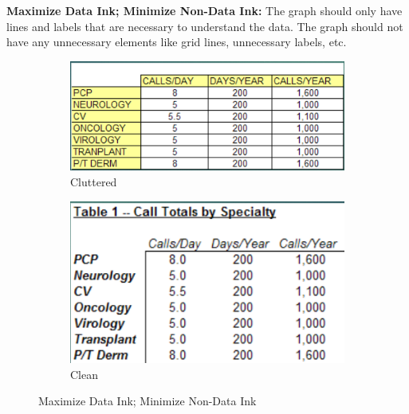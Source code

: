 \documentclass[11pt,fleqn]{book} %
\begin{document}
\begin{example}
  \textbf{Maximize Data Ink; Minimize Non-Data Ink:}
  The graph should only have lines and labels that are
  necessary to understand the data. The graph should
  not have any unnecessary elements like grid lines,
  unnecessary labels, etc.


  \begin{figure}[hitb!]
    \centering
    \begin{subfigure}[c]{0.45\linewidth}
        \includegraphics[width=\linewidth]{Pictures/max-data1.png}
        \caption{Cluttered}
        \label{fig:max-data-cluttered}
    \end{subfigure}
    \hfill
    \begin{subfigure}[c]{0.45\linewidth}
        \includegraphics[width=\linewidth]{Pictures/max-data2.png}
        \caption{Clean}
        \label{fig:max-data-clean}
    \end{subfigure}
    \caption{Maximize Data Ink; Minimize Non-Data Ink}
    \label{fig:max-data}
  \end{figure}

\end{example}

\newpage
\end{document}
